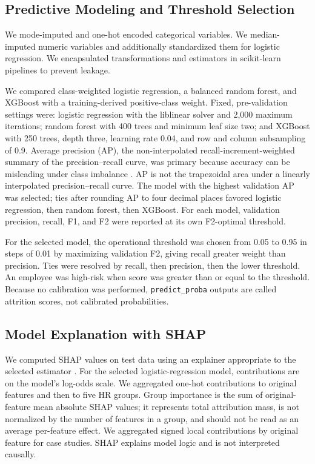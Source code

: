 \documentclass[11pt]{article}
\begin{document}
\FloatBarrier

\subsection{Predictive Modeling and Threshold Selection}
We mode-imputed and one-hot encoded categorical variables. We median-imputed numeric variables and additionally standardized them for logistic regression. We encapsulated transformations and estimators in scikit-learn pipelines to prevent leakage.

We compared class-weighted logistic regression, a balanced random forest, and XGBoost with a training-derived positive-class weight. Fixed, pre-validation settings were: logistic regression with the liblinear solver and 2,000 maximum iterations; random forest with 400 trees and minimum leaf size two; and XGBoost with 250 trees, depth three, learning rate 0.04, and row and column subsampling of 0.9. Average precision (AP), the non-interpolated recall-increment-weighted summary of the precision--recall curve, was primary because accuracy can be misleading under class imbalance \cite{saito2015}. AP is not the trapezoidal area under a linearly interpolated precision--recall curve. The model with the highest validation AP was selected; ties after rounding AP to four decimal places favored logistic regression, then random forest, then XGBoost. For each model, validation precision, recall, F1, and F2 were reported at its own F2-optimal threshold.

For the selected model, the operational threshold was chosen from 0.05 to 0.95 in steps of 0.01 by maximizing validation F2, giving recall greater weight than precision. Ties were resolved by recall, then precision, then the lower threshold. An employee was high-risk when score was greater than or equal to the threshold. Because no calibration was performed, \texttt{predict\_proba} outputs are called attrition scores, not calibrated probabilities.

\subsection{Model Explanation with SHAP}
We computed SHAP values on test data using an explainer appropriate to the selected estimator \cite{lundberg2017}. For the selected logistic-regression model, contributions are on the model's log-odds scale. We aggregated one-hot contributions to original features and then to five HR groups. Group importance is the sum of original-feature mean absolute SHAP values; it represents total attribution mass, is not normalized by the number of features in a group, and should not be read as an average per-feature effect. We aggregated signed local contributions by original feature for case studies. SHAP explains model logic and is not interpreted causally.
\end{document}
